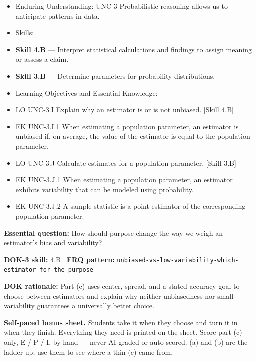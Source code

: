 \documentclass[11pt]{article}
\begin{document}


{\small
\begin{itemize}[leftmargin=1.5em,itemsep=2pt,topsep=2pt]
  \item Enduring Understanding: UNC-3 Probabilistic reasoning allows us to anticipate patterns in data.
  \item Skills:
  \item \textbf{Skill 4.B} --- Interpret statistical calculations and findings to assign meaning or assess a claim.
  \item \textbf{Skill 3.B} --- Determine parameters for probability distributions.
  \item Learning Objectives and Essential Knowledge:
  \item LO UNC-3.I Explain why an estimator is or is not unbiased. [Skill 4.B]
  \item EK UNC-3.I.1 When estimating a population parameter, an estimator is unbiased if, on average, the value of the estimator is equal to the population parameter.
  \item LO UNC-3.J Calculate estimates for a population parameter. [Skill 3.B]
  \item EK UNC-3.J.1 When estimating a population parameter, an estimator exhibits variability that can be modeled using probability.
  \item EK UNC-3.J.2 A sample statistic is a point estimator of the corresponding population parameter.
\end{itemize}
}
\textbf{Essential question:} How should purpose change the way we weigh an estimator's bias and variability?\par
\textbf{DOK-3 skill:} 4.B \textperiodcentered\ \textbf{FRQ pattern:} {\small\texttt{unbiased-\allowbreak{}vs-\allowbreak{}low-\allowbreak{}variability-\allowbreak{}which-\allowbreak{}estimator-\allowbreak{}for-\allowbreak{}the-\allowbreak{}purpose}}\par
\textbf{DOK rationale:} Part (c) uses center, spread, and a stated accuracy goal to choose between estimators and explain why neither unbiasedness nor small variability guarantees a universally better choice.\par

\textbf{Self-paced bonus sheet.} Students take it when they choose and turn it in when they finish. Everything they need is printed on the sheet. Score part (c) only, E / P / I, by hand --- never AI-graded or auto-scored. (a) and (b) are the ladder up; use them to see where a thin (c) came from.\par
\end{document}
